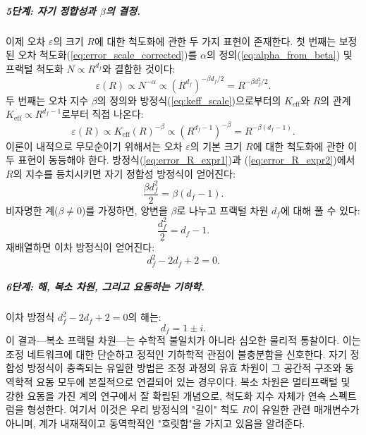 \documentclass[11pt,a4paper]{article}
\newcommand{\Ke}{K_{\mathrm{eff}}}
\theoremstyle{remark}
\begin{document}
	\subparagraph*{5단계: 자기 정합성과 \(\beta\)의 결정.}
	이제 오차 \(\varepsilon\)의 크기 \(R\)에 대한 척도화에 관한 두 가지 표현이 존재한다. 첫 번째는 보정된 오차 척도화(\ref{eq:error_scale_corrected})를 \(\alpha\)의 정의(\ref{eq:alpha_from_beta}) 및 프랙털 척도화 \(N \propto R^{d_f}\)와 결합한 것이다:
	\begin{equation}
		\varepsilon(R) \propto N^{-\alpha} \propto (R^{d_f})^{-\beta d_f/2} = R^{-\beta d_f^2 / 2}.
		\label{eq:error_R_expr1}
	\end{equation}
	두 번째는 오차 지수 \(\beta\)의 정의와 방정식(\ref{eq:keff_scale})으로부터의 \(\Ke\)와 \(R\)의 관계 \(\Ke \propto R^{d_f-1}\)로부터 직접 나온다:
	\begin{equation}
		\varepsilon(R) \propto \Ke(R)^{-\beta} \propto (R^{d_f-1})^{-\beta} = R^{-\beta(d_f-1)}.
		\label{eq:error_R_expr2}
	\end{equation}
	이론이 내적으로 무모순이기 위해서는 오차 \(\varepsilon\)의 기본 크기 \(R\)에 대한 척도화에 관한 이 두 표현이 동등해야 한다. 방정식(\ref{eq:error_R_expr1})과 (\ref{eq:error_R_expr2})에서 \(R\)의 지수를 등치시키면 자기 정합성 방정식이 얻어진다:
	\begin{equation}
		\frac{\beta d_f^2}{2} = \beta (d_f - 1).
		\label{eq:consistency}
	\end{equation}
	비자명한 계(\(\beta \neq 0\))를 가정하면, 양변을 \(\beta\)로 나누고 프랙털 차원 \(d_f\)에 대해 풀 수 있다:
	\begin{equation}
		\frac{d_f^2}{2} = d_f - 1.
	\end{equation}
	재배열하면 이차 방정식이 얻어진다:
	\begin{equation}
		d_f^2 - 2d_f + 2 = 0.
		\label{eq:quadratic}
	\end{equation}
	
	\subparagraph*{6단계: 해, 복소 차원, 그리고 요동하는 기하학.}
	이차 방정식 \(d_f^2 - 2d_f + 2 = 0\)의 해는:
	\begin{equation}
		d_f = 1 \pm i.
		\label{eq:df_solution}
	\end{equation}
	이 결과—복소 프랙털 차원—는 수학적 불일치가 아니라 심오한 물리적 통찰이다. 이는 조정 네트워크에 대한 단순하고 정적인 기하학적 관점이 불충분함을 신호한다. 자기 정합성 방정식이 충족되는 유일한 방법은 조정 과정의 유효 차원이 그 공간적 구조와 동역학적 요동 모두에 본질적으로 연결되어 있는 경우이다. 복소 차원은 멀티프랙털 및 강한 요동을 가진 계의 연구에서 잘 확립된 개념으로, 척도화 지수 자체가 연속 스펙트럼을 형성한다. 여기서 이것은 우리 방정식의 "길이" 척도 \(R\)이 유일한 관련 매개변수가 아니며, 계가 내재적이고 동역학적인 "흐릿함"을 가지고 있음을 알려준다.
	
\end{document}
